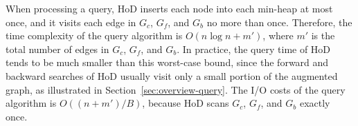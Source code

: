 \documentclass{sig-alternate}
\def\GC{G_c}
\def\GF{G_f}
\def\GB{G_b}
\begin{document}
\begin{sloppy}
When processing a query, HoD inserts each node into each min-heap at most once, and it visits each edge in $\GC$, $\GF$, and $\GB$ no more than once. Therefore, the time complexity of the query algorithm is $O(n \log n + m')$, where $m'$ is the total number of edges in $\GC$, $\GF$, and $\GB$. In practice, the query time of HoD tends to be much smaller than this worst-case bound, since the forward and backward searches of HoD usually visit only a small portion of the augmented graph, as illustrated in Section~\ref{sec:overview-query}. The I/O costs of the query algorithm is $O((n + m')/B)$, because HoD scans $\GC$, $\GF$, and $\GB$ exactly once.

%


%


\end{sloppy}
\end{document}
